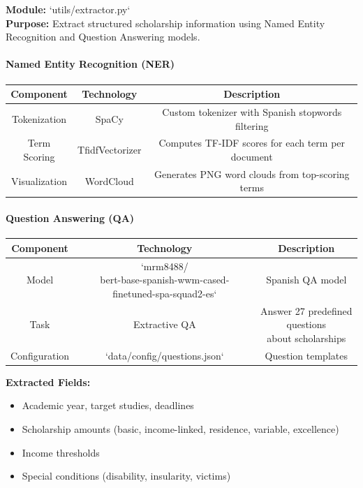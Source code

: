 \documentclass{article}
\begin{document}
\textbf{Module:} `utils/extractor.py` \\
\textbf{Purpose:} Extract structured scholarship information using Named Entity Recognition and Question Answering models.

\paragraph{Named Entity Recognition (NER)}

\begin{center}
\begin{tabular}{ |c|c|c| } 
 \hline
Component & Technology & Description \\
 \hline\hline
 Tokenization & SpaCy & Custom tokenizer with Spanish stopwords filtering \\
 Term Scoring & TfidfVectorizer & Computes TF-IDF scores for each term per document \\
 Visualization & WordCloud & Generates PNG word clouds from top-scoring terms \\
 \hline
\end{tabular}
\end{center}

\paragraph{Question Answering (QA)}

\begin{center}
\begin{tabular}{ |c|c|c| } 
 \hline
Component & Technology & Description \\
 \hline\hline
 Model & \makecell{`mrm8488/\\bert-base-spanish-wwm-cased-finetuned-spa-squad2-es`} & Spanish QA model \\
 Task & Extractive QA & \makecell{Answer 27 predefined questions\\about scholarships} \\
 Configuration & `data/config/questions.json` & Question templates \\
 \hline
\end{tabular}
\end{center}

\textbf{Extracted Fields:}
\begin{itemize}
\item Academic year, target studies, deadlines
\item Scholarship amounts (basic, income-linked, residence, variable, excellence)
\item Income thresholds
\item Special conditions (disability, insularity, victims)
\end{itemize}
\end{document}
